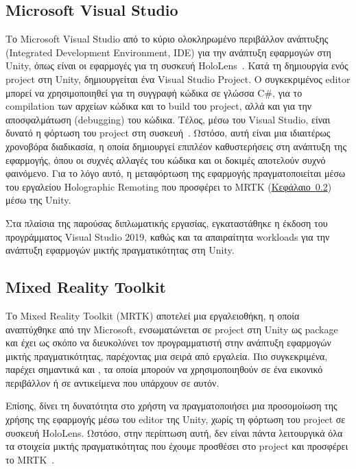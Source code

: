 \subsection{Microsoft Visual Studio}
Το Microsoft Visual Studio από το κύριο ολοκληρωμένο περιβάλλον ανάπτυξης (Integrated Development Environment, IDE) για την ανάπτυξη εφαρμογών στη Unity, όπως είναι οι εφαρμογές για τη συσκευή HoloLens~\cite{thetuvix_2023_install}. Κατά τη δημιουργία ενός project στη Unity, δημιουργείται ένα Visual Studio Project. Ο συγκεκριμένος editor μπορεί να χρησιμοποιηθεί για τη συγγραφή κώδικα σε γλώσσα C\#, για το compilation των αρχείων κώδικα και το build του project, αλλά και για την αποσφαλμάτωση (debugging) του κώδικα. Τέλος, μέσω του Visual Studio, είναι δυνατό η φόρτωση του project στη συσκευή~\cite{vtieto_2022_using}. Ωστόσο, αυτή είναι μια ιδιαιτέρως χρονοβόρα διαδικασία, η οποία δημιουργεί επιπλέον καθυστερήσεις στη ανάπτυξη της εφαρμογής, όπου οι συχνές αλλαγές του κώδικα και οι δοκιμές αποτελούν συχνό φαινόμενο. Για το λόγο αυτό, η μεταφόρτωση της εφαρμογής πραγματοποιείται μέσω του εργαλείου Holographic Remoting που προσφέρει το MRTK (\hyperref[subsec:mrtk]{Κεφάλαιο~\ref*{subsec:mrtk}}) μέσω της Unity.

Στα πλαίσια της παρούσας διπλωματικής εργασίας, εγκαταστάθηκε η έκδοση του προγράμματος Visual Studio 2019, καθώς και τα απαιραίτητα workloads για την ανάπτυξη εφαρμογών μικτής πραγματικότητας στη Unity.

\subsection{Mixed Reality Toolkit}\label{subsec:mrtk}
Το Mixed Reality Toolkit (MRTK) αποτελεί μια εργαλειοθήκη, η οποία αναπτύχθηκε από την Microsoft, ενσωματώνεται σε project στη Unity ως package και έχει ως σκόπο να διευκολύνει τον προγραμματιστή στην ανάπτυξη εφαρμογών μικτής πραγματικότητας, παρέχοντας μια σειρά από εργαλεία. Πιο συγκεκριμένα, παρέχει σημαντικά  και , τα οποία μπορούν να χρησιμοποιηθούν σε ένα εικονικό περιβάλλον ή σε αντικείμενα που υπάρχουν σε αυτόν.

Επίσης, δίνει τη δυνατότητα στο χρήστη να πραγματοποιήσει μια προσομοίωση της χρήσης της εφαρμογής μέσω του editor της Unity, χωρίς τη φόρτωση του project σε συσκευή HoloLens. Ωστόσο, στην περίπτωση αυτή, δεν είναι πάντα λειτουργικά όλα τα στοιχεία μικτής πραγματικότητας που έχουμε προσθέσει στο project και προσφέρει το MRTK~\cite{polarkev_2022_mrtk2unity}.

